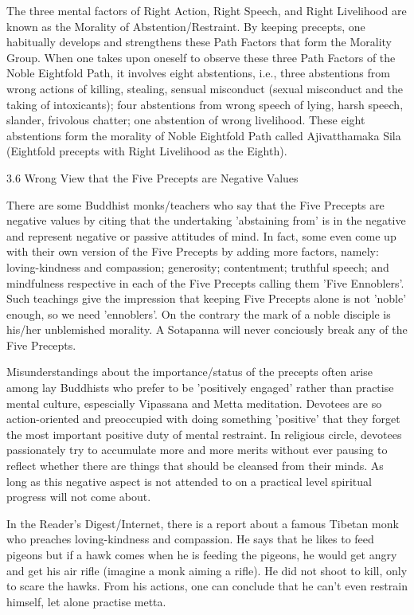 The three mental factors of Right Action, Right Speech, and Right Livelihood are known as the Morality of Abstention/Restraint. By keeping precepts, one habitually develops and strengthens these Path Factors that form the Morality Group. When one takes upon oneself to observe these three Path Factors of the Noble Eightfold Path, it involves eight abstentions, i.e., three abstentions from wrong actions of killing, stealing, sensual misconduct (sexual misconduct and the taking of intoxicants); four abstentions from wrong speech of lying, harsh speech, slander, frivolous chatter; one abstention of wrong livelihood. These eight abstentions form the morality of Noble Eightfold Path called Ajivatthamaka Sila (Eightfold precepts with Right Livelihood as the Eighth).

3.6 Wrong View that the Five Precepts are Negative Values

There are some Buddhist monks/teachers who say that the Five Precepts are negative values by citing that the undertaking 'abstaining from' is in the negative and represent negative or passive attitudes of mind. In fact, some even come up with their own version of the Five Precepts by adding more factors, namely: loving-kindness and compassion; generosity; contentment; truthful speech; and mindfulness respective in each of the Five Precepts calling them 'Five Ennoblers'. Such teachings give the impression that keeping Five Precepts alone is not 'noble' enough, so we need 'ennoblers'. On the contrary the mark of a noble disciple is his/her unblemished morality. A Sotapanna will never conciously break any of the Five Precepts.

Misunderstandings about the importance/status of the precepts often arise among lay Buddhists who prefer to be 'positively engaged' rather than practise mental culture, espescially Vipassana and Metta meditation. Devotees are so action-oriented and preoccupied with doing something 'positive' that they forget the most important positive duty of mental restraint. In religious circle, devotees passionately try to accumulate more and more merits without ever pausing to reflect whether there are things that should be cleansed from their minds. As long as this negative aspect is not attended to on a practical level spiritual progress will not come about.

In the Reader's Digest/Internet, there is a report about a famous Tibetan monk who preaches loving-kindness and compassion. He says that he likes to feed pigeons but if a hawk comes when he is feeding the pigeons, he would get angry and get his air rifle (imagine a monk aiming a rifle). He did not shoot to kill, only to scare the hawks. From his actions, one can conclude that he can't even restrain himself, let alone practise metta.

